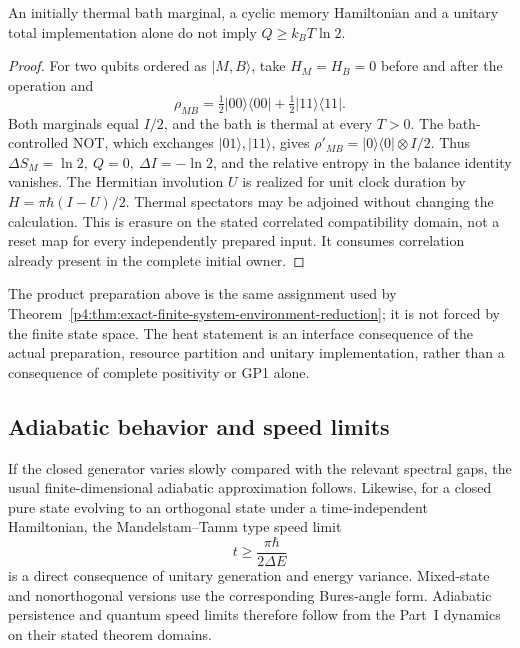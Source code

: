\documentclass[12pt,a4paper]{article}
\begin{document}
\begin{proposition}
\label{p4:prop:v2211-correlated-erasure-witness}
An initially thermal bath marginal, a cyclic memory Hamiltonian and a
unitary total implementation alone do not imply \(Q\ge k_BT\ln2\).
\end{proposition}
\begin{proof}
For two qubits ordered as \(|M,B\rangle\), take
\(H_M=H_B=0\) before and after the operation and
\[
 \rho_{MB}=\tfrac12|00\rangle\langle00|
                  +\tfrac12|11\rangle\langle11|.
\]
Both marginals equal \(I/2\), and the bath is thermal at every \(T>0\).
The bath-controlled NOT, which exchanges \(|01\rangle,|11\rangle\),
gives \(\rho'_{MB}=|0\rangle\langle0|\otimes I/2\).  Thus
\(\Delta S_M=\ln2,\ Q=0,\ \Delta I=-\ln2\), and the relative entropy in
the balance identity vanishes.  The Hermitian involution \(U\) is realized
for unit clock duration by \(H=\pi\hbar(I-U)/2\).  Thermal spectators may
be adjoined without changing the calculation.  This is erasure on the
stated correlated compatibility domain, not a reset map for every
independently prepared input.  It consumes correlation already present
in the complete initial owner.
\end{proof}

The product preparation above is the same assignment used by
Theorem~\ref{p4:thm:exact-finite-system-environment-reduction}; it is not
forced by the finite state space.  The heat statement is an interface
consequence of the actual preparation, resource partition and unitary
implementation, rather than a consequence of complete positivity or GP1
alone.



\subsection{Adiabatic behavior and speed limits}
\label{p4:sec:part3-adiabatic}

If the closed generator varies slowly compared with the relevant spectral gaps, the usual finite-dimensional adiabatic approximation follows.
Likewise, for a closed pure state evolving to an orthogonal state under a time-independent Hamiltonian, the Mandelstam--Tamm type speed limit
\begin{equation}
\label{p4:eq:speed-limit}
t\ge \frac{\pi\hbar}{2\Delta E}
\end{equation}
is a direct consequence of unitary generation and energy variance. Mixed-state and nonorthogonal versions use the corresponding Bures-angle form.
Adiabatic persistence and quantum speed limits therefore follow from the Part~I dynamics on their stated theorem domains.
\end{document}
